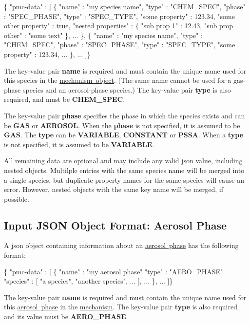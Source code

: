 \begin{DoxyCode}
\{ "pmc-data" : [
  \{
    "name" : "my species name",
    "type" : "CHEM\_SPEC",
    "phase" : "SPEC\_PHASE",
    "type" : "SPEC\_TYPE",
    "some property" : 123.34,
    "some other property" : true,
    "nested properties" : \{
       "sub prop 1" : 12.43,
       "sub prop other" : "some text"
    \},
    ...
  \},
  \{
    "name" : "my species name",
    "type" : "CHEM\_SPEC",
    "phase" : "SPEC\_PHASE",
    "type" : "SPEC\_TYPE",
    "some property" : 123.34,
    ...
  \},
  ...
]\}
\end{DoxyCode}
 The key-\/value pair {\bfseries name} is required and must contain the unique name used for this species in the \mbox{\hyperlink{input_format_mechanism}{mechanism object}}. (The same name cannot be used for a gas-\/phase species and an aerosol-\/phase species.) The key-\/value pair {\bfseries type} is also required, and must be {\bfseries C\+H\+E\+M\+\_\+\+S\+P\+EC}.

The key-\/value pair {\bfseries phase} specifies the phase in which the species exists and can be {\bfseries G\+AS} or {\bfseries A\+E\+R\+O\+S\+OL}. When the {\bfseries phase} is not specified, it is assumed to be {\bfseries G\+AS}. The {\bfseries type} can be {\bfseries V\+A\+R\+I\+A\+B\+LE}, {\bfseries C\+O\+N\+S\+T\+A\+NT} or {\bfseries P\+S\+SA}. When a {\bfseries type} is not specified, it is assumed to be {\bfseries V\+A\+R\+I\+A\+B\+LE}.

All remaining data are optional and may include any valid {\ttfamily json} value, including nested objects. Multilple entries with the same species name will be merged into a single species, but duplicate property names for the same species will cause an error. However, nested objects with the same key name will be merged, if possible. \hypertarget{input_format_aero_phase}{}\subsection{Input J\+S\+ON Object Format\+: Aerosol Phase}\label{input_format_aero_phase}
A {\ttfamily json} object containing information about an \mbox{\hyperlink{phlex_aero_phase}{aerosol phase}} has the following format\+:


\begin{DoxyCode}
\{ "pmc-data" : [
  \{
    "name" : "my aerosol phase"
    "type" : "AERO\_PHASE"
    "species" : [
      "a species",
      "another species",
      ...
    ],
    ...
  \},
  ...
]\}
\end{DoxyCode}
 The key-\/value pair {\bfseries name} is required and must contain the unique name used for this \mbox{\hyperlink{phlex_aero_phase}{aerosol phase}} in the \mbox{\hyperlink{input_format_mechanism}{mechanism}}. The key-\/value pair {\bfseries type} is also required and its value must be {\bfseries A\+E\+R\+O\+\_\+\+P\+H\+A\+SE}.

